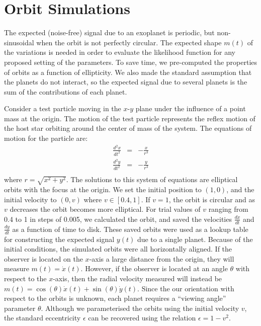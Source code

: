 \documentclass[useAMS,usenatbib]{mn2e}
\begin{document}
\section{Orbit Simulations}\label{sec:orbits}
The expected (noise-free) signal due to an exoplanet is periodic, but
non-sinusoidal when the orbit is not perfectly circular. The expected
shape $m(t)$ of the variations is needed in order to evaluate the likelihood
function for any proposed setting of the parameters.
To save time, we pre-computed the properties of orbits as a function of
ellipticity. We also made the standard assumption that the planets do not
interact, so the expected signal due to several planets is the sum of the
contributions of each planet.

Consider a test particle moving in the $x$-$y$ plane under the influence of a
point mass at the origin. The motion of the test particle represents the
reflex motion of the host star orbiting around the center of mass of the
system. The equations of motion for the particle are:
\begin{eqnarray}
\frac{d^2x}{dt^2} &=& -\frac{x}{r^3} \\
\frac{d^2y}{dt^2} &=& -\frac{y}{r^3} \\
\end{eqnarray}
where $r = \sqrt{x^2 + y^2}$. The solutions to this system of equations are elliptical orbits
with the focus at the origin. We set the initial position to $(1, 0)$, and
the initial velocity to $(0, v)$ where $v \in [0.4, 1]$.
If $v=1$, the orbit is circular and as $v$ decreases the orbit becomes more
elliptical. For trial values of $v$ ranging from 0.4 to 1 in steps of 0.005,
we calculated the orbit, and saved the
velocities $\frac{dx}{dt}$ and $\frac{dy}{dt}$ as a function of time to disk.
These saved orbits were used as a lookup table for constructing the expected
signal $y(t)$ due to a single planet.
Because of the initial conditions, the simulated orbits were all horizontally
aligned. If the observer is located on the $x$-axis a large distance
from the origin, they will measure $m(t) = \dot{x}(t)$. However, if the
observer is located at an angle $\theta$ with respect to the $x$-axis, then
the radial velocity measured will instead be
$m(t) = \cos(\theta)\dot{x}(t) + \sin(\theta)\dot{y}(t)$.
Since the our orientation with respect to the orbits is unknown, each planet
requires a ``viewing angle'' parameter $\theta$.
Although we parameterised the orbits using the initial velocity $v$,
the standard eccentricity $\epsilon$ can be recovered using the relation
$\epsilon = 1 - v^2$.
\end{document}
